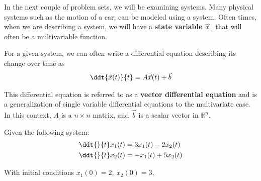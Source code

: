 

In the next couple of problem sets, we will be examining systems. 
Many physical systems such as the motion of a car, can be modeled using a system.
Often times, when we are describing a system, we will have a \textbf{state variable $\vec{x},$}
that will often be a multivariable function. 

For a given system, we can often write a differential equation describing its change over time as
\begin{align}
\ddt{\vec{x}(t)}{t} = A \vec{x}(t) + \vec{b}
\end{align}

This differential equation is referred to as a \textbf{vector differential equation} 
and is a generalization of single variable differential equations to the multivariate case.
In this context, $A$ is a $n \times n$ matrix, and $\vec{b}$ is a scalar vector in $\mathbb{R}^n.$

Given the following system:
\begin{align*}
    \ddt{}{t}x_{1}(t) &= 3 x_{1}(t) - 2 x_{2}(t) \\
    \ddt{}{t}x_{2}(t) &= - x_{1}(t) + 5 x_{2}(t)
\end{align*}

With initial conditions $x_{1}(0) = 2, \ x_{2}(0) = 3,$

